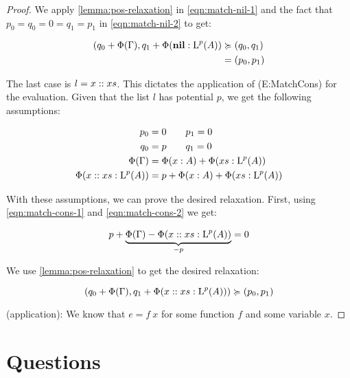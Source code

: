 \begin{proof}
   We apply \cref{lemma:pos-relaxation} in \cref{eqn:match-nil-1} and the fact that \(p_0 = q_0 = 0 = q_1 = p_1\) in \cref{eqn:match-nil-2} to get: 
   
   \begin{align}
      (q_0 + \Phi(\Gamma), q_1 + \Phi(\listnil : \ralist{p}{A})   &\relaxation (q_0, q_1) \label{eqn:match-nil-1}\\
                                                                  &= (p_0, p_1) \label{eqn:match-nil-2}
   \end{align}

   The last case is \(l = x :: xs\). This dictates the application of (E:MatchCons) for the evaluation. Given that the list \(l\) has potential \(p\), we get the following assumptions:

   \begin{align}
      p_0            &= 0 \qquad p_1 = 0\nonumber\\
      q_0            &= p \qquad q_1 = 0\nonumber\\
      \Phi(\Gamma)   &= \Phi(x : A) + \Phi(xs : \ralist{p}{A})\label{eqn:match-cons-1}\\
      \Phi(\cons{x}{xs} : \ralist{p}{A}) &= p + \Phi(x : A) + \Phi(xs : \ralist{p}{A})\label{eqn:match-cons-2}
   \end{align}

   With these assumptions, we can prove the desired relaxation. First, using \cref{eqn:match-cons-1} and \cref{eqn:match-cons-2} we get:

   \begin{align}
      p + \underbrace{\Phi(\Gamma) - \Phi(x :: xs : \text{L}^{p}(A))}_{-p} = 0
   \end{align}

   We use \cref{lemma:pos-relaxation} to get the desired relaxation:

   \[
      (q_0 + \Phi(\Gamma), q_1 + \Phi(x :: xs : \text{L}^{p}(A))) \succcurlyeq (p_0, p_1)
   \]

   (application): We know that \(e = f~x\) for some function \(f\) and some variable \(x\). 
\end{proof}
 
\section{Questions}

